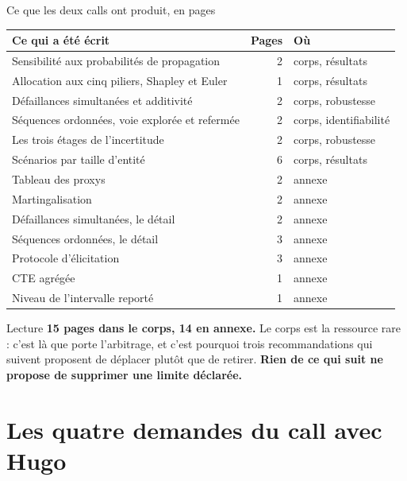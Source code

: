 \documentclass[11pt]{beamer}
\begin{document}
\begin{frame}{Ce que les deux calls ont produit, en pages}
\scriptsize
\begin{center}
\begin{tabular}{@{}l r l@{}}
\toprule
\textbf{Ce qui a été écrit} & \textbf{Pages} & \textbf{Où} \\
\midrule
Sensibilité aux probabilités de propagation & 2 & corps, résultats \\
Allocation aux cinq piliers, Shapley et Euler & 1 & corps, résultats \\
Défaillances simultanées et additivité & 2 & corps, robustesse \\
Séquences ordonnées, voie explorée et refermée & 2 & corps, identifiabilité \\
Les trois étages de l'incertitude & 2 & corps, robustesse \\
Scénarios par taille d'entité & 6 & corps, résultats \\
\midrule
Tableau des proxys & 2 & annexe \\
Martingalisation & 2 & annexe \\
Défaillances simultanées, le détail & 2 & annexe \\
Séquences ordonnées, le détail & 3 & annexe \\
Protocole d'élicitation & 3 & annexe \\
CTE agrégée & 1 & annexe \\
Niveau de l'intervalle reporté & 1 & annexe \\
\bottomrule
\end{tabular}
\end{center}
\vspace{1mm}
\begin{block}{Lecture}
\textbf{15 pages dans le corps, 14 en annexe.} Le corps est la ressource rare : c'est là que
porte l'arbitrage, et c'est pourquoi trois recommandations qui suivent proposent de déplacer
plutôt que de retirer. \textbf{Rien de ce qui suit ne propose de supprimer une limite
déclarée.}
\end{block}
\end{frame}

\section*{Les quatre demandes du call avec Hugo}

\end{document}
